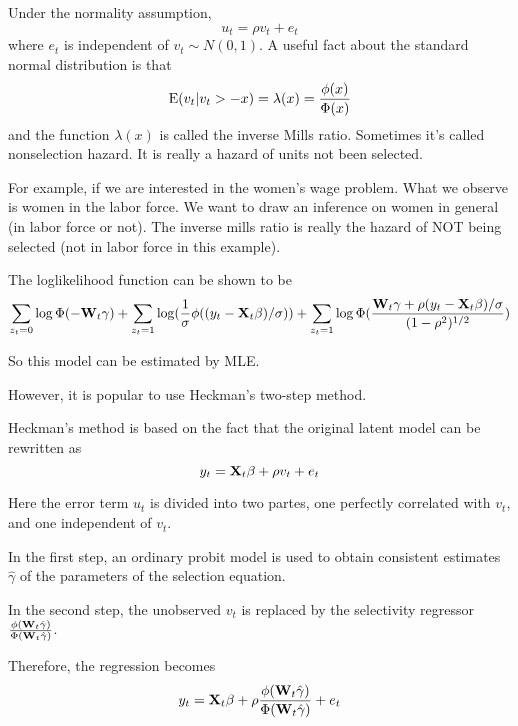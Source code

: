 Under the normality assumption,
\begin{equation}
u_t=\rho v_t+e_t
\end{equation}
where $e_t$ is independent of $v_t \sim N(0,1)$.  A useful fact
about the standard normal distribution is that
\begin{equation}
{\rm E} (v_t | v_t>-x)=\lambda (x) =\frac{\phi(x)}{\Phi(x)}
\end{equation}
and the function $\lambda(x)$ is called the inverse Mills ratio.
Sometimes it's called nonselection hazard.  It is really a hazard of
units not been selected.  

For example, if we are interested in the women's wage problem.  What
we observe is women in the labor force.  We want to draw an inference
on women in general (in labor force or not).  The inverse mills ratio
is really the hazard of NOT being selected (not in labor force in this
example).  

The loglikelihood function can be shown to be
\begin{equation}
\sum_{z_t=0} \log \Phi(-{\bf W}_t \gamma)+\sum_{z_t=1}
\log(\frac{1}{\sigma} \phi ((y_t - {\bf X}_t \beta)/\sigma)) +
\sum_{z_t=1} \log \Phi (\frac{{\bf W}_t \gamma+\rho (y_t-{\bf X}_t
\beta)/\sigma}{(1-\rho^2)^{1/2}})
\end{equation}

So this model can be estimated by MLE.

However, it is popular to use Heckman's two-step method.

Heckman's method is based on the fact that the original latent
model can be rewritten as
\begin{equation}
y_t={\bf X}_t \beta + \rho v_t +e_t
\end{equation}

Here the error term $u_t$ is divided into two partes, one
perfectly correlated with $v_t$, and one independent of $v_t$.

In the first step, an ordinary probit model is used to obtain
consistent estimates $\hat \gamma$ of the parameters of the
selection equation.

In the second step, the unobserved $v_t$ is replaced by the
selectivity regressor $\frac{\phi({\bf W}_t \hat
\gamma)}{\Phi({\bf W}_t \hat \gamma)}$.

Therefore, the regression becomes
\begin{equation}
y_t={\bf X}_t \beta + \rho \frac{\phi({\bf W}_t \hat
\gamma)}{\Phi({\bf W}_t \hat \gamma)} + e_t
\end{equation}

